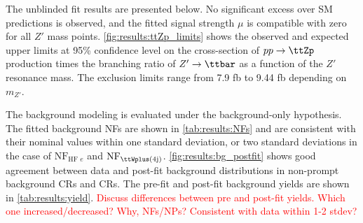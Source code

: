 \documentclass[../thesis.tex]{subfiles}
\begin{document}
The unblinded fit results are presented below. No significant excess over \acs{SM} predictions is observed, and the fitted signal strength $\mu$ is compatible with zero for all $Z'$ mass points. \autoref{fig:results:ttZp_limits} shows the observed and expected upper limits at 95\% confidence level on the cross-section of $pp\rightarrow\ttZp$ production times the branching ratio of $Z'\rightarrow\ttbar$ as a function of the $Z'$ resonance mass. The exclusion limits range from 7.9 fb to 9.44 fb depending on $m_{Z'}$.

The background modeling is evaluated under the background-only hypothesis. The fitted background \acs{NF}s are shown in \autoref{tab:results:NFs} and are consistent with their nominal values within one standard deviation, or two standard deviations in the case of $\mathrm{NF}_{\text{HF }e}$ and $\mathrm{NF}_{\ttWplus(4\mathrm{j})}$. \autoref{fig:results:bg_postfit} shows good agreement between data and post-fit background distributions in non-prompt background \acs{CR}s and \ttW \acs{CR}s.
The pre-fit and post-fit background yields are shown in \autoref{tab:results:yield}. \textcolor{red}{Discuss differences between pre and post-fit yields. Which one increased/decreased? Why, NFs/NPs? Consistent with data within 1-2 stdev?}


\begin{table}[!ht]
\centering
\scriptsize
\setlength{\tabcolsep}{3pt} %
\renewcommand{\arraystretch}{1.2} %
\caption{\label{tab:results:NFs}Normalization factors for backgrounds with dedicated \acs{CR}s, obtained from a simultaneous fit in all \acs{CR}s and \acs{SR} under the background-only hypothesis. 
The nominal pre-fit value is 1 for all \acs{NF}s and 0 for the scaling factors $a_0$ and $a_1$. Uncertainties shown include both statistical and systematic uncertainties.}
\end{table}
\end{document}
